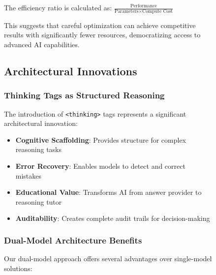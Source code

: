 \begin{figure}[H]
\begin{table}[H]
The efficiency ratio is calculated as: $\frac{\text{Performance}}{\text{Parameters} \times \text{Compute Cost}}$

This suggests that careful optimization can achieve competitive results with significantly fewer resources, democratizing access to advanced AI capabilities.

\subsection{Architectural Innovations}

\subsubsection{Thinking Tags as Structured Reasoning}

The introduction of \texttt{<thinking>} tags represents a significant architectural innovation:

\begin{itemize}
    \item \textbf{Cognitive Scaffolding}: Provides structure for complex reasoning tasks
    \item \textbf{Error Recovery}: Enables models to detect and correct mistakes
    \item \textbf{Educational Value}: Transforms AI from answer provider to reasoning tutor
    \item \textbf{Auditability}: Creates complete audit trails for decision-making
\end{itemize}

\subsubsection{Dual-Model Architecture Benefits}

Our dual-model approach offers several advantages over single-model solutions:

\begin{figure}[H]
\centering
{}
\end{figure}
\end{table}
\end{figure}
